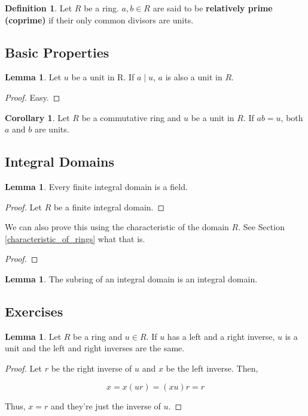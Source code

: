 \documentclass{article}
\theoremstyle{definition}
\newtheorem{definition}{Definition}
\newtheorem{lemma}[theorem]{Lemma}
\newtheorem{corollary}{Corollary}[theorem]
\begin{document}
\begin{definition}
    Let $R$ be a ring. $a,b \in R$ are said to be \textbf{relatively prime (coprime)} if their only common divisors are units.
\end{definition}

\subsection{Basic Properties}

\begin{lemma}
    Let $u$ be a unit in R. If $a \mid u$, $a$ is also a unit in $R$.
\end{lemma}
\begin{proof}
    Easy.
\end{proof}

\begin{corollary}
    Let $R$ be a commutative ring and $u$ be a unit in $R$. If $ab = u$, both $a$ and $b$ are units.
\end{corollary}

\subsection{Integral Domains}

\begin{lemma}\label{finite_domains_are_fields}
    Every finite integral domain is a field.
\end{lemma}
\begin{proof}
    Let $R$ be a finite integral domain.
\end{proof}

We can also prove this using the characteristic of the domain $R$. See Section \ref{characteristic_of_rings}
what that is.

\begin{proof}
    
\end{proof}

\begin{lemma}
    The subring of an integral domain is an integral domain.
\end{lemma}

\subsection{Exercises}

\begin{lemma}
    Let $R$ be a ring and $u \in R$. If $u$ has a left and a right
    inverse, $u$ is a unit and the left and right inverses are the same.
\end{lemma}
\begin{proof}
    Let $r$ be the right inverse of $u$ and $x$ be the left inverse. Then,

    \[ x = x(ur) = (xu)r = r\]

    Thus, $x=r$ and they're just the inverse of $u$.
\end{proof}
\end{document}
